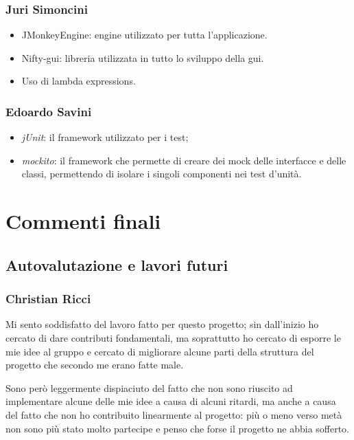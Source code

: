 \subsection{Juri Simoncini}

\begin{itemize}
\item JMonkeyEngine: engine utilizzato per tutta l'applicazione.
\item Nifty-gui: libreria utilizzata in tutto lo sviluppo della gui.
\item Uso di lambda expressions.
\end{itemize}

\subsection{Edoardo Savini}

\begin{itemize}
    \item \emph{jUnit}: il framework utilizzato per i test;
    \item \emph{mockito}: il framework che permette di creare dei mock delle interfacce e delle classi, permettendo di isolare i singoli componenti nei test d'unità.
\end{itemize}

\chapter{Commenti finali}

\section{Autovalutazione e lavori futuri}

\subsection{Christian Ricci}

Mi sento soddisfatto del lavoro fatto per questo progetto; sin dall'inizio ho cercato di dare contributi fondamentali, ma soprattutto ho cercato di esporre le mie idee al gruppo e cercato di migliorare alcune parti della struttura del progetto che secondo me erano fatte male.

Sono però leggermente dispiaciuto del fatto che non sono riuscito ad implementare alcune delle mie idee a causa di alcuni ritardi, ma anche a causa del fatto che non ho contribuito linearmente al progetto: più o meno verso metà non sono più stato molto partecipe e penso che forse il progetto ne abbia sofferto.

